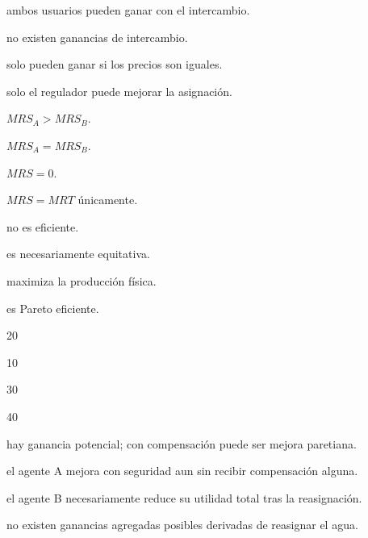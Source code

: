 \begin{opts}
    \item ambos usuarios pueden ganar con el intercambio.
    \item no existen ganancias de intercambio.
    \item solo pueden ganar si los precios son iguales.
    \item solo el regulador puede mejorar la asignación.
\end{opts}

\begin{opts}
    \item $MRS_A>MRS_B$.
    \item $MRS_A=MRS_B$.
    \item $MRS=0$.
    \item $MRS=MRT$ únicamente.
\end{opts}

\begin{opts}
    \item no es eficiente.
    \item es necesariamente equitativa.
    \item maximiza la producción física.
    \item es Pareto eficiente.
\end{opts}

\begin{opts}
    \item 20
    \item 10
    \item 30
    \item 40
\end{opts}

\begin{opts}
    \item hay ganancia potencial; con compensación puede ser mejora paretiana.
    \item el agente A mejora con seguridad aun sin recibir compensación alguna.
    \item el agente B necesariamente reduce su utilidad total tras la reasignación.
    \item no existen ganancias agregadas posibles derivadas de reasignar el agua.
\end{opts}

